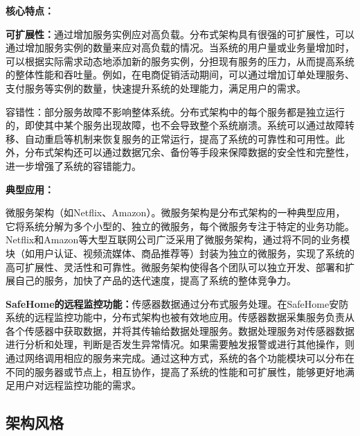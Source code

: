 \textbf{核心特点：}

\textbf{可扩展性：}通过增加服务实例应对高负载。分布式架构具有很强的可扩展性，可以通过增加服务实例的数量来应对高负载的情况。当系统的用户量或业务量增加时，可以根据实际需求动态地添加新的服务实例，分担现有服务的压力，从而提高系统的整体性能和吞吐量。例如，在电商促销活动期间，可以通过增加订单处理服务、支付服务等实例的数量，快速提升系统的处理能力，满足用户的需求。

容错性：部分服务故障不影响整体系统。分布式架构中的每个服务都是独立运行的，即使其中某个服务出现故障，也不会导致整个系统崩溃。系统可以通过故障转移、自动重启等机制来恢复服务的正常运行，提高了系统的可靠性和可用性。此外，分布式架构还可以通过数据冗余、备份等手段来保障数据的安全性和完整性，进一步增强了系统的容错能力。

\textbf{典型应用：}

微服务架构（如Netflix、Amazon）。微服务架构是分布式架构的一种典型应用，它将系统分解为多个小型的、独立的微服务，每个微服务专注于特定的业务功能。Netflix和Amazon等大型互联网公司广泛采用了微服务架构，通过将不同的业务模块（如用户认证、视频流媒体、商品推荐等）封装为独立的微服务，实现了系统的高可扩展性、灵活性和可靠性。微服务架构使得各个团队可以独立开发、部署和扩展自己的服务，加快了产品的迭代速度，提高了系统的整体竞争力。

\textbf{SafeHome的远程监控功能：}传感器数据通过分布式服务处理。在SafeHome安防系统的远程监控功能中，分布式架构也被有效地应用。传感器数据采集服务负责从各个传感器中获取数据，并将其传输给数据处理服务。数据处理服务对传感器数据进行分析和处理，判断是否发生异常情况。如果需要触发报警或进行其他操作，则通过网络调用相应的服务来完成。通过这种方式，系统的各个功能模块可以分布在不同的服务器或节点上，相互协作，提高了系统的性能和可扩展性，能够更好地满足用户对远程监控功能的需求。


\subsection{架构风格}

